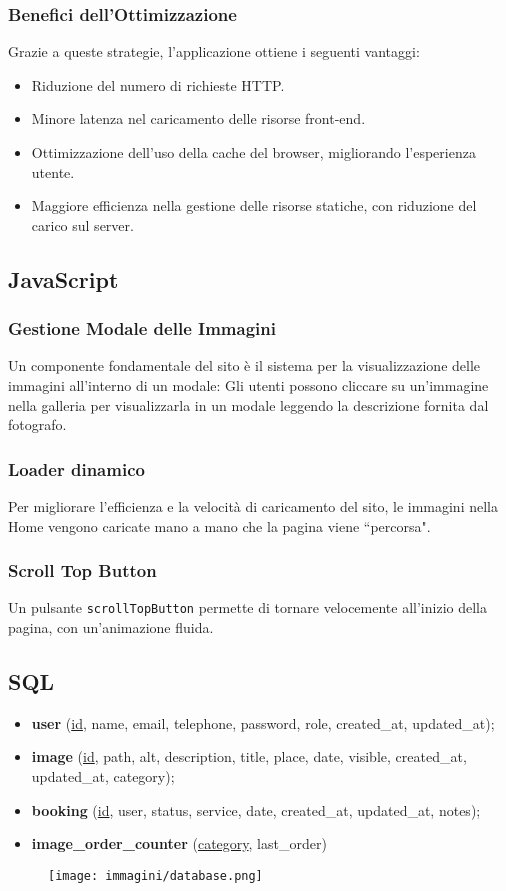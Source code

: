 \subsubsection{Benefici dell'Ottimizzazione}
Grazie a queste strategie, l’applicazione ottiene i seguenti vantaggi:
\begin{itemize}
    \item Riduzione del numero di richieste HTTP.
    \item Minore latenza nel caricamento delle risorse front-end.
    \item Ottimizzazione dell’uso della cache del browser, migliorando l’esperienza utente.
    \item Maggiore efficienza nella gestione delle risorse statiche, con riduzione del carico sul server.
\end{itemize}


\subsection{JavaScript}
\subsubsection{Gestione Modale delle Immagini}
Un componente fondamentale del sito \`e il sistema per la visualizzazione delle immagini all'interno di un modale:
Gli utenti possono cliccare su un'immagine nella galleria per visualizzarla in un modale leggendo la descrizione fornita dal fotografo.
\subsubsection{Loader dinamico}
Per migliorare l'efficienza e la velocit\`a di caricamento del sito, le immagini nella Home vengono caricate mano a mano che la pagina viene ``percorsa".
\subsubsection{Scroll Top Button}
Un pulsante \texttt{scrollTopButton} permette di tornare velocemente all'inizio della pagina, con un'animazione fluida.

\subsection{SQL}
\begin{itemize}
    \item \textbf{user} (\underline{id}, name, email, telephone, password, role, created\_at, updated\_at);
    \item \textbf{image} (\underline{id}, path, alt, description, title, place, date, visible, created\_at, updated\_at, category);
    \item \textbf{booking} (\underline{id}, user, status, service, date, created\_at, updated\_at, notes);
    \item \textbf{image\_order\_counter} (\underline{category}, last\_order)
\end{itemize}
\begin{figure}[H]
    \centering
    \texttt{[image: immagini/database.png]}
\end{figure}